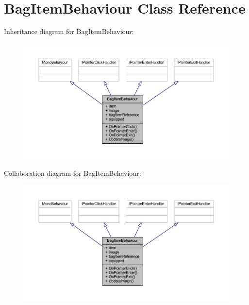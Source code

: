 \hypertarget{class_bag_item_behaviour}{}\section{Bag\+Item\+Behaviour Class Reference}
\label{class_bag_item_behaviour}


Inheritance diagram for Bag\+Item\+Behaviour\+:
\nopagebreak
\begin{figure}[H]
\begin{center}
\leavevmode
\includegraphics[width=350pt]{class_bag_item_behaviour__inherit__graph}
\end{center}
\end{figure}


Collaboration diagram for Bag\+Item\+Behaviour\+:
\nopagebreak
\begin{figure}[H]
\begin{center}
\leavevmode
\includegraphics[width=350pt]{class_bag_item_behaviour__coll__graph}
\end{center}
\end{figure}
